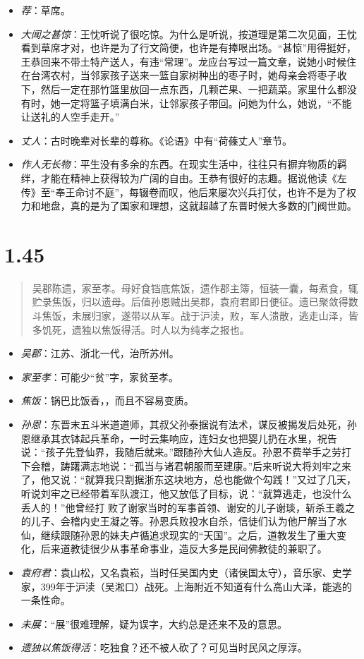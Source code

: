 \documentclass[]{book}
\providecommand{\tightlist}{%
  \setlength{\itemsep}{0pt}\setlength{\parskip}{0pt}}
\begin{document}
\begin{itemize}
\item
  \emph{荐}：草席。
\item
  \emph{大闻之甚惊}：王忱听说了很吃惊。为什么是听说，按道理是第二次见面，王忱看到草席才对，也许是为了行文简便，也许是有捧哏出场。``甚惊''用得挺好，王恭回来不带土特产送人，有违``常理''。龙应台写过一篇文章，说她小时候住在台湾农村，当邻家孩子送来一篮自家树种出的枣子时，她母亲会将枣子收下，然后一定在那竹篮里放回一点东西，几颗芒果、一把蔬菜。家里什么都没有时，她一定将篮子填满白米，让邻家孩子带回。问她为什么，她说，``不能让送礼的人空手走开。''
\item
  \emph{丈人}：古时晚辈对长辈的尊称。《论语》中有``荷蓧丈人''章节。
\item
  \emph{作人无长物}：平生没有多余的东西。在现实生活中，往往只有摒弃物质的羁绊，才能在精神上获得较为广阔的自由。王恭有很好的志趣。据说他读《左传》至``奉王命讨不庭''，每辍卷而叹，他后来屡次兴兵打仗，也许不是为了权力和地盘，真的是为了国家和理想，这就超越了东晋时候大多数的门阀世勋。
\end{itemize}

\section{1.45}\label{section-44}

\begin{quote}
吴郡陈遗，家至孝。母好食铛底焦饭，遗作郡主簿，恒装一囊，每煮食，辄贮录焦饭，归以遗母。后值孙恩贼出吴郡，袁府君即日便征。遗已聚敛得数斗焦饭，未展归家，遂带以从军。战于沪渎，败，军人溃散，逃走山泽，皆多饥死，遗独以焦饭得活。时人以为纯孝之报也。
\end{quote}

\begin{itemize}
\tightlist
\item
  \emph{吴郡}：江苏、浙北一代，治所苏州。
\item
  \emph{家至孝}：可能少``贫''字，家贫至孝。
\item
  \emph{焦饭}：锅巴比饭香，，而且不容易变质。
\item
  \emph{孙恩}：东晋末五斗米道道师，其叔父孙泰据说有法术，谋反被揭发后处死，孙恩继承其衣钵起兵革命，一时云集响应，连妇女也把婴儿扔在水里，祝告说：``孩子先登仙界，我随后就来。''跟随孙大仙人造反。孙恩不费举手之劳打下会稽，踌躇满志地说：``孤当与诸君朝服而至建康。''后来听说大将刘牢之来了，他又说：``就算我只割据浙东这块地方，总也能做个勾践！''又过了几天，听说刘牢之已经带着军队渡江，他又放低了目标，说：``就算逃走，也没什么丢人的！''他曾经打
  败了谢家当时的军事首领、谢安的儿子谢琰，斩杀王羲之的儿子、会稽内史王凝之等。孙恩兵败投水自杀，信徒们认为他尸解当了水仙，继续跟随孙恩的妹夫卢循追求现实的``天国''。之后，道教发生了重大变化，后来道教徒很少从事革命事业，造反大多是民间佛教徒的兼职了。
\item
  \emph{袁府君}：袁山松，又名袁崧，当时任吴国内史（诸侯国太守），音乐家、史学家，399年于沪渎（吴淞口）战死。上海附近不知道有什么高山大泽，能逃的一条性命。
\item
  \emph{未展}：``展''很难理解，疑为误字，大约总是还来不及的意思。
\item
  \emph{遗独以焦饭得活}：吃独食？还不被人砍了？可见当时民风之厚淳。
\end{itemize}
\end{document}
